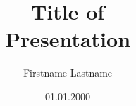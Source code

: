 \documentclass{beamer}
\author{Firstname Lastname}
\title{Title of \\ Presentation}
\institute{Institute}
\date{01.01.2000}
\begin{document}
\frame{\maketitle}
\end{document}
